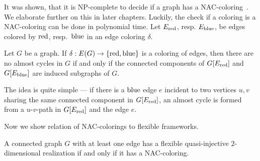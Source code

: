 It was shown, that it is NP-complete to decide if a graph has a NAC-coloring~\cite{np_complete}.
We elaborate further on this in later chapters.
Luckily, the check if a coloring is a NAC-coloring can be done in polynomial time.
Let \( E_{\text{red}}\), resp. \( E_{\text{blue}} \), be edges colored by \( \text{red} \), resp.~\( \text{blue} \)
in an edge coloring \( \delta \).
%
\begin{lemma}
	Let \( G \) be a graph. If \( \delta: E(G) \to \{ \text{red}, \text{blue} \} \) is a coloring of edges,
	then there are no almost cycles in \( G \) if and only if the connected components
	of \( G[E_{\text{red}}] \) and \( G[E_{\text{blue}}] \) are induced subgraphs of \( G \).
\end{lemma}
%
The idea is quite simple --- if there is a \( \text{blue} \) edge \( e \) incident to
two vertices \( u, v \) sharing the same connected component in \( G[E_{\text{red}}] \),
an almost cycle is formed from a \( u \)-\( v \)-path in \( G[E_{\text{red}}] \)
and the edge \( e \).

Now we show relation of NAC-colorings to flexible frameworks.
%
\begin{theorem}
	A connected graph \( G \) with at least one edge has a flexible
	quasi-injective \( 2 \)-dimensional realization if and only if it has a NAC-coloring.
\end{theorem}
%



